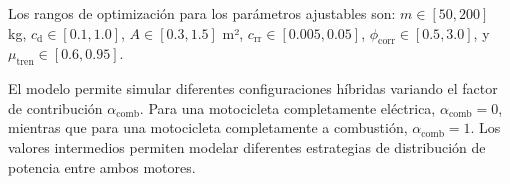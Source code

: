 Los rangos de optimización para los parámetros ajustables son: $m \in [50, 200]$ kg, $c_{\mathrm{d}} \in [0.1, 1.0]$, $A \in [0.3, 1.5]$ m², $c_{\mathrm{rr}} \in [0.005, 0.05]$, $\phi_{\mathrm{corr}} \in [0.5, 3.0]$, y $\mu_{\mathrm{tren}} \in [0.6, 0.95]$.

El modelo permite simular diferentes configuraciones híbridas variando el factor de contribución $\alpha_{\mathrm{comb}}$. Para una motocicleta completamente eléctrica, $\alpha_{\mathrm{comb}} = 0$, mientras que para una motocicleta completamente a combustión, $\alpha_{\mathrm{comb}} = 1$. Los valores intermedios permiten modelar diferentes estrategias de distribución de potencia entre ambos motores.
